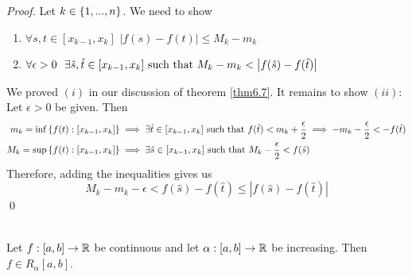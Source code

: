 \begin{proof}
    Let $k \in \left\{1, ..., n\right\}$. We need to show 
    \begin{enumerate}[($i$)]
        \item $\forall s, t \in [x_{k-1}, x_k]$ $\left|f(s) - f(t)\right| \leq M_k - m_k$
        \item $\forall \epsilon > 0 ~~\exists \hat{s}, \hat{t} \in [x_{k-1}, x_k] \text{ such that } M_k - m_k < \left|f(\hat{s})-f(\hat{t})\right|$
    \end{enumerate}
    We proved $(i)$ in our discussion of theorem \ref{thm6.7}. It remains to show $(ii)$: \\
    Let $\epsilon > 0$ be given. Then 
    \begin{align*}
        m_k = \inf \left\{f(t) : [x_{k-1}, x_k]\right\} &\implies \exists \hat{t} \in [x_{k-1}, x_k] \text{ such that } f(\hat{t}) < m_k + \frac{\epsilon}{2} \implies -m_k - \frac{\epsilon}{2} < -f(\hat{t}) \\
        M_k = \sup \left\{f(t) : [x_{k-1}, x_k]\right\} &\implies \exists \hat{s} \in [x_{k-1}, x_k] \text{ such that } M_k - \frac{\epsilon}{2} < f(\hat{s})
    \end{align*}
    Therefore, adding the inequalities gives us 
    $$M_k -m_k - \epsilon < f(\hat{s}) - f(\hat{t}) \leq \left|f(\hat{s}) - f(\hat{t})\right|$$
    \qed
\end{proof}

\begin{theorem} \leavevmode \\
    \label{thm6.8}
    Let $f : [a,b] \to \mathbb{R}$ be continuous and let $\alpha : [a,b] \to \mathbb{R}$ be increasing. Then $f \in R_\alpha [a,b]$.
\end{theorem}

